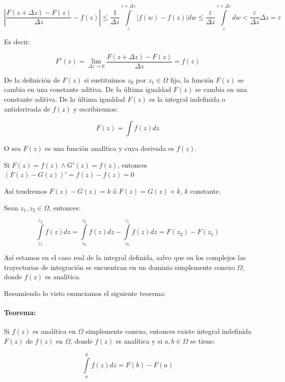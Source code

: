 \documentclass[a4paper,12pt]{article}
\begin{document}
\[
\left| \frac{F(z + \Delta z) - F(z)}{\Delta z} - f(z) \right| \leq \frac{1}{\Delta z} \int\limits_{z}^{z + \Delta z} |f(w) - f(z)|dw \leq \frac{\varepsilon}{\Delta z} \int\limits_{z}^{z + \Delta z} dw < \frac{\varepsilon}{\Delta z} \Delta z = \varepsilon
\]

Es decir:

\[
F'(z) = \lim_{\Delta z \to 0} \frac{F(z + \Delta z) - F(z)}{\Delta z} = f(z)
\]

De la definición de $F(z)$ si sustituimos $z_0$ por $z_1 \in \Omega$ fijo, la función $F(z)$ se cambia en una constante aditiva. De la última igualdad $F(z)$ se cambia en una constante aditiva. De la última igualdad $F(z)$ es la integral indefinida o antiderivada de $f(z)$ y escribiremos:

\[
F(z) = \int f(z)dz
\]

O sea $F(z)$ es una función analítica y cuya derivada es $f(z)$.

Si $F(z) = f(z) \wedge G'(z) = f(z)$, entonces $(F(z) - G(z))' = f(z) - f(z) = 0$

Así tendremos $F(z) - G(z) = k$ ó $F(z) = G(z) + k$, $k$ constante.

Sean $z_1, z_2 \in \Omega$, entonces:

\[
\int\limits_{z_1}^{z_2} f(z)dz = \int\limits_{z_0}^{z_2} f(z)dz - \int\limits_{z_0}^{z_1} f(z)dz = F(z_2) - F(z_1)
\]


Así estamos en el caso real de la integral definida, salvo que en los complejos las trayectorias de integración se encuentran en un dominio simplemente conexo $\Omega$, donde $f(z)$ es analítica.

Resumiendo lo visto enunciamos el siguiente teorema:

\paragraph{Teorema:}

Si $f(z)$ es analítica en $\Omega$ simplemente conexo, entonces existe integral indefinida $F(z)$ de $f(z)$ en $\Omega$, donde $f(z)$ es analítica y si $a, b \in \Omega$ se tiene:

\[
\int\limits_{a}^{b} f(z)dz = F(b) - F(a)
\]
\end{document}

